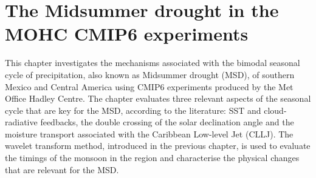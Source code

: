 
\chapter{\label{ch:6-msd}The Midsummer drought in the MOHC CMIP6 experiments}

This chapter investigates the mechanisms associated with  the bimodal seasonal cycle of precipitation, also known as Midsummer drought (MSD), of southern Mexico and Central America using CMIP6 experiments produced by the Met Office Hadley Centre.
The chapter evaluates three relevant aspects of the seasonal cycle that are key for the MSD, according to the literature: SST and cloud-radiative feedbacks, the double crossing of the solar declination angle and the moisture transport associated with the Caribbean Low-level 
Jet (CLLJ). 
The wavelet transform method, introduced in the previous chapter, is used to evaluate the timings of the monsoon in the region and characterise the physical changes that are relevant for the MSD.
